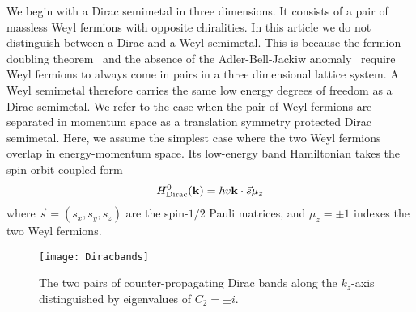 We begin with a Dirac semimetal in three dimensions. It consists of a pair of massless Weyl fermions with opposite chiralities. In this article we do not distinguish between a Dirac and a Weyl semimetal. This is because the fermion doubling theorem~\cite{Nielsen_Ninomiya_1981,NielsenNinomiyaPLB1981,NielsenNinomiya83} and the absence of the Adler-Bell-Jackiw anomaly~\cite{Adler69,BellJackiw69} require Weyl fermions to always come in pairs in a three dimensional lattice system. A Weyl semimetal therefore carries the same low energy degrees of freedom as a Dirac semimetal. We refer to the case when the pair of Weyl fermions are separated in momentum space as a translation symmetry protected Dirac semimetal. Here, we assume the simplest case where the two Weyl fermions overlap in energy-momentum space. Its low-energy band Hamiltonian takes the spin-orbit coupled form \begin{align}H^0_{\mathrm{Dirac}}({\bf k})=\hbar v{\bf k}\cdot\vec{s}\mu_z\label{DiracHam0}\end{align} where $\vec{s}=(s_x,s_y,s_z)$ are the spin-$1/2$ Pauli matrices, and $\mu_z=\pm1$ indexes the two Weyl fermions.

\begin{figure}[htbp]
\centering\texttt{[image: Diracbands]}
\caption{The two pairs of counter-propagating Dirac bands along the $k_z$-axis distinguished by eigenvalues of $C_2=\pm i$.}\label{fig:Diracbands}
\end{figure}

